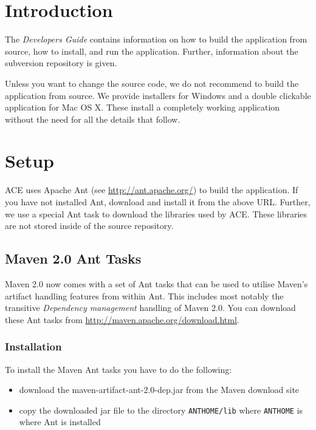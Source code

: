 \documentclass[11pt,a4paper]{article}
\begin{document}


\tableofcontents
\newpage

\section{Introduction}

The \emph{Developers Guide} contains information on how to build the application
from source, how to install, and run the application. Further, information
about the subversion repository is given.

Unless you want to change the source code, we do not recommend to build the
application from source. We provide installers for Windows and a double
clickable application for Mac OS X. These install a completely working
application without the need for all the details that follow.


\section{Setup}
ACE uses Apache Ant (see \href{http://ant.apache.org/}{http://ant.apache.org/})
to build the application. If you have not installed Ant, download and install
it from the above URL. Further, we use a special Ant task to download the
libraries used by ACE. These libraries are not stored inside of the source
repository.

\subsection{Maven 2.0 Ant Tasks}
Maven 2.0 now comes with a set of Ant tasks that can be used to utilise Maven's
artifact handling features from within Ant. This includes most notably the
transitive \emph{Dependency management} handling of Maven 2.0. You can
download these Ant tasks from 
\href{http://maven.apache.org/download.html}{http://maven.apache.org/download.html}.

\subsubsection{Installation}
To install the Maven Ant tasks you have to do the following:
\begin{itemize}
 \item download the maven-artifact-ant-2.0-dep.jar from the Maven download site
 \item copy the downloaded jar file to the directory \texttt{ANTHOME/lib} where \texttt{ANTHOME} is where Ant is installed
\end{itemize}
\end{document}
